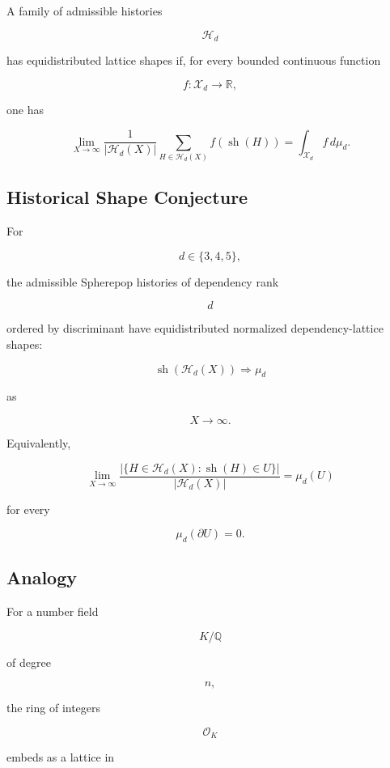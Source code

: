 \documentclass[12pt,oneside]{article}
\theoremstyle{definition}
\theoremstyle{remark}
\begin{document}
A family of admissible histories

\[
\mathcal H_d
\]

has equidistributed lattice shapes if, for every bounded continuous function

\[
f:\mathcal X_d\rightarrow\mathbb R,
\]

one has

\[
\lim_{X\rightarrow\infty}
\frac{1}{|\mathcal H_d(X)|}
\sum_{H\in\mathcal H_d(X)}
f(\operatorname{sh}(H))
=
\int_{\mathcal X_d}
f\,d\mu_d.
\]

\subsection*{Historical Shape Conjecture}

For

\[
d\in\{3,4,5\},
\]

the admissible Spherepop histories of dependency rank

\[
d
\]

ordered by discriminant have equidistributed normalized dependency-lattice
shapes:

\[
\operatorname{sh}
(
\mathcal H_d(X)
)
\Rightarrow
\mu_d
\]

as

\[
X\rightarrow\infty.
\]

Equivalently,

\[
\lim_{X\rightarrow\infty}
\frac{
|\{H\in\mathcal H_d(X):\operatorname{sh}(H)\in U\}|
}{
|\mathcal H_d(X)|
}
=
\mu_d(U)
\]

for every

\[
\mu_d(\partial U)=0.
\]

\subsection*{Analogy}

For a number field

\[
K/\mathbb Q
\]

of degree

\[
n,
\]

the ring of integers

\[
\mathcal O_K
\]

embeds as a lattice in
\end{document}
